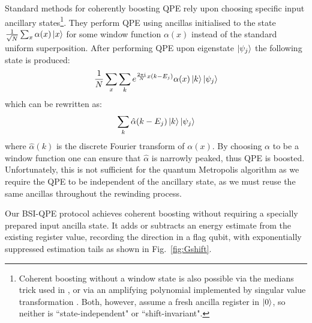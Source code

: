 \documentclass[aps,floatfix,10pt,amssymb,amsfont,amsmath,superscriptaddress,float,nofootinbib,longbibliography,nobalancelastpage,twocolumn]{revtex4-2}
\begin{document}
Standard methods \cite{babbush2018encoding, rendon2022effects, berry2024analyzing, greenaway2024case, patel2026optimal} for coherently boosting QPE rely upon choosing specific input ancillary states\footnote{Coherent boosting without a window state is also possible via the medians trick \cite{nagaj2009fast} used in \cite{Temme_2011}, or via an amplifying polynomial implemented by singular value transformation \cite{rall2021faster}. Both, however, assume a fresh ancilla register in $\ket{0}$, so neither is ``state-independent" or ``shift-invariant".}. They perform QPE using ancillas initialised to the state $\frac{1}{\sqrt{N}}\sum_x \alpha(x) \ket{x}$ for some window function $\alpha(x)$ instead of the standard uniform superposition. After performing QPE upon eigenstate $\ket{\psi_j}$ the following state is produced:
\begin{equation}
   \frac{1}{N} \sum_x \sum_k e^{\frac{2 \pi i}{N}x(k-E_j)} \alpha(x)\ket{k}\ket{\psi_j}
\end{equation}
which can be rewritten as:
\begin{equation}
    \sum_k \hat\alpha(k-E_j) \ket{k}\ket{\psi_j}
\end{equation}
where $\hat \alpha(k)$ is the discrete Fourier transform of $\alpha(x)$. By choosing $\alpha$ to be a window function one can ensure that $\hat \alpha$ is narrowly peaked, thus QPE is boosted. Unfortunately, this is not sufficient for the quantum Metropolis algorithm as we require the QPE to be independent of the ancillary state, as we must reuse the same ancillas throughout the rewinding process. 

Our BSI-QPE protocol achieves coherent boosting without requiring a specially prepared input ancilla state. It adds or subtracts an energy estimate from the existing register value, recording the direction in a flag qubit, with exponentially suppressed estimation tails as shown in Fig.~\ref{fig:Gshift}.
\end{document}
